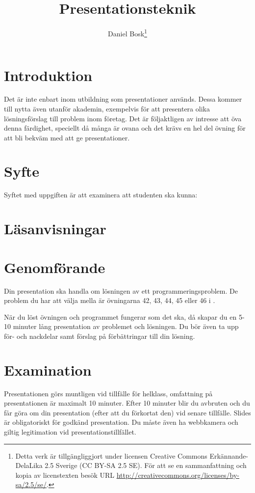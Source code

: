 \documentclass[a4paper,nocourse]{miunasgn}
\title{Presentationsteknik}
\author{Daniel Bosk\thanks{%
	Detta verk är tillgängliggjort under licensen Creative Commons 
	Erkännande-DelaLika 2.5 Sverige (CC BY-SA 2.5 SE).
	För att se en sammanfattning och kopia av licenstexten besök URL 
	\url{http://creativecommons.org/licenses/by-sa/2.5/se/}.
	}
}
\date{\svnId}
\begin{document}
\maketitle
\thispagestyle{foot}
\tableofcontents


\section{Introduktion}

Det är inte enbart inom utbildning som presentationer används.
Dessa kommer till nytta även utanför akademin, exempelvis för att presentera 
olika lösningsförslag till problem inom företag.
Det är följaktligen av intresse att öva denna färdighet, speciellt då många är 
ovana och det krävs en hel del övning för att bli bekväm med att ge 
presentationer.


\section{Syfte}

Syftet med uppgiften är att examinera att studenten ska kunna:
\begin{itemize}
  
\end{itemize}


\section{Läsanvisningar}




\section{Genomförande}

Din presentation ska handla om lösningen av ett programmeringsproblem.
De problem du har att välja mella är övningarna 42, 43, 44, 45 eller 46 
i  \cite{pythonkramaren1}.

När du löst övningen och programmet fungerar som det ska, då skapar du en 5-10 
minuter lång presentation av problemet och lösningen.
Du bör även ta upp för- och nackdelar samt förslag på förbättringar till din 
lösning.


\section{Examination}

Presentationen görs muntligen vid tillfälle för helklass, omfattning på 
presentationen är maximalt 10 minuter.
Efter 10 minuter blir du avbruten och du får göra om din presentation (efter 
att du förkortat den) vid senare tillfälle.
Slides är obligatoriskt för godkänd presentation.
Du måste även ha webbkamera och giltig legitimation vid 
presentationstillfället.


\printbibliography
\end{document}
